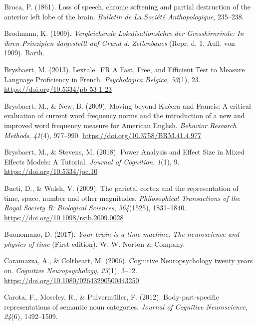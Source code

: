 \documentclass[
  a4paper,12pt,twoside,onecolumn,openright,final,oldfontcommands]{memoir}
\newlength{\cslhangindent}
\newlength{\cslentryspacingunit} %
\newenvironment{CSLReferences}[2] %
 {%
  \setlength{\parindent}{0pt}
  \ifodd #1
  \let\oldpar\par
  \def\par{\hangindent=\cslhangindent\oldpar}
  \fi
  \setlength{\parskip}{#2\cslentryspacingunit}
 }%
 {}
\begin{document}
\begin{CSLReferences}{1}{0}
\leavevmode{}%
Broca, P. (1861). Loss of speech, chronic softening and partial destruction of the anterior left lobe of the brain. \emph{Bulletin de La Société Anthopologique}, 235--238.

\leavevmode{}%
Brodmann, K. (1909). \emph{Vergleichende {Lokalisationslehre} der {Grosshirnrinde}: In ihren {Prinzipien} dargestellt auf {Grund} d. {Zellenbaues}} (Repr. d. 1. Aufl. von 1909). Barth.

\leavevmode{}%
Brysbaert, M. (2013). Lextale\_FR {A} {Fast}, {Free}, and {Efficient} {Test} to {Measure} {Language} {Proficiency} in {French}. \emph{Psychologica Belgica}, \emph{53}(1), 23. \url{https://doi.org/10.5334/pb-53-1-23}

\leavevmode{}%
Brysbaert, M., \& New, B. (2009). Moving beyond {Kučera} and {Francis}: {A} critical evaluation of current word frequency norms and the introduction of a new and improved word frequency measure for {American} {English}. \emph{Behavior Research Methods}, \emph{41}(4), 977--990. \url{https://doi.org/10.3758/BRM.41.4.977}

\leavevmode{}%
Brysbaert, M., \& Stevens, M. (2018). Power {Analysis} and {Effect} {Size} in {Mixed} {Effects} {Models}: {A} {Tutorial}. \emph{Journal of Cognition}, \emph{1}(1), 9. \url{https://doi.org/10.5334/joc.10}

\leavevmode{}%
Bueti, D., \& Walsh, V. (2009). The parietal cortex and the representation of time, space, number and other magnitudes. \emph{Philosophical Transactions of the Royal Society B: Biological Sciences}, \emph{364}(1525), 1831--1840. \url{https://doi.org/10.1098/rstb.2009.0028}

\leavevmode{}%
Buonomano, D. (2017). \emph{Your brain is a time machine: The neuroscience and physics of time} (First edition). W. W. Norton \& Company.

\leavevmode{}%
Caramazza, A., \& Coltheart, M. (2006). Cognitive {Neuropsychology} twenty years on. \emph{Cognitive Neuropsychology}, \emph{23}(1), 3--12. \url{https://doi.org/10.1080/02643290500443250}

\leavevmode{}%
Carota, F., Moseley, R., \& Pulvermüller, F. (2012). Body-part-specific representations of semantic noun categories. \emph{Journal of Cognitive Neuroscience}, \emph{24}(6), 1492--1509.


\end{CSLReferences}
\end{document}
